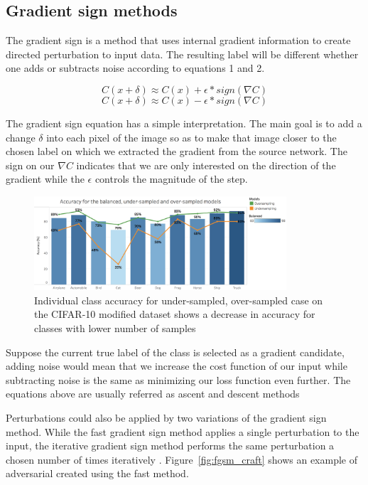 \documentclass[runningheads,a4paper]{llncs}
\begin{document}
\subsection{Gradient sign methods}

The gradient sign is a method that uses internal gradient information to create directed perturbation to input data. The resulting label will be different whether one adds or subtracts noise according to equations 1 and 2. 

\begin{equation}
C(x + \delta)\approx C(x) + \epsilon * sign(\nabla C)
\end{equation}
\begin{equation}
C(x + \delta)\approx C(x) - \epsilon * sign(\nabla C)
\end{equation}

The gradient sign equation has a simple interpretation. The main goal is to add a change $\delta$ into each pixel of the image so as to make that image closer to the chosen label on which we extracted the gradient from the source network. The sign on our $\nabla C$ indicates that we are only interested on the direction of the gradient while the $\epsilon$ controls the magnitude of the step.

\begin{figure}
	\centering
	\includegraphics[height=3.5cm]{graph_non_pert.png}
	\caption{Individual class accuracy for under-sampled, over-sampled case on the CIFAR-10 modified dataset shows a decrease in accuracy for classes with lower number of samples}
	\label{fig:acc_graph}
\end{figure}

Suppose the current true label of the class is selected as a gradient candidate, adding noise would mean that we increase the cost function of our input while subtracting noise is the same as minimizing our loss function even further. 
The equations above are usually referred as ascent and descent methods

Perturbations could also be applied by two variations of the gradient sign method. While the fast gradient sign method applies a single perturbation to the input, the iterative gradient sign method performs the same perturbation a chosen number of times iteratively \cite{goodfellow2014}. Figure~\ref{fig:fgsm_craft} shows an example of adversarial created using the fast method.
\end{document}
